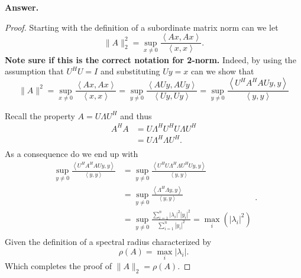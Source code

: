 \documentclass{article}
\theoremstyle{remark}
\newcommand{\newpara}
  {
  \vskip 0.4cm
  }
\begin{document}
  \textbf{Answer.} 
\begin{proof}
  Starting with the definition of a subordinate matrix norm \cite{sul} can we let \[
  \|A\|_{2}^{2} = \sup_{x \neq 0} \frac{\left<Ax, Ax \right>}{ \left<x,x \right>} .
  \] 
  \textbf{Note sure if this is the correct notation for 2-norm.} 
   Indeed, by using the assumption that $U^{H} U = I$ and substituting $Uy =  x$ can we show that \[
    \|A\|_{}^{2} = \sup_{x \neq 0} \frac{\left<Ax, Ax \right>}{\left<x,x \right>}  = \sup_{y\neq 0}  \frac{\left<AU y, A U y \right>}{ \left<U y, Uy \right>} = \sup_{y \neq 0} \frac{\left<U^{H} A^{H} A U y,y \right>}{\left<y,y \right>} 
  \] 
  \newpara
  Recall the property $A = U \Lambda  U^{H}$ and thus
  \[
    \begin{split}
  A^{H} A   & = U \Lambda ^{H} U^{H} U \Lambda U^{H}  \\
   & = U \Lambda ^{H} \Lambda U^{H}.   \\
    \end{split} 
  \] 
  As a consequence do we end up with \[
    \begin{split}
  \sup_{y \neq 0} \frac{\left<U^{H} A^{H} A U y, y  \right>}{\left<y,y \right>}   & = \sup_{y\neq 0}  \frac{\left<U^{H} U \Lambda ^{H} \Lambda  U^{H} U  y, y\right>}{ \left<y,y \right>}  \\
  &=  \sup_{y \neq 0} \frac{\left<\Lambda ^{H} \Lambda  y, y \right>}{\left<y,y \right>}  \\  
  &=   \sup_{ y \neq 0}  \frac{\sum_{i=1}^{n}  \left\lvert \lambda _{i} \right\rvert ^2  \left| y_{i} \right|^2}{ \sum_{i=1}^{n}  \left| y_{i} \right|^2}  = \max _{i} \left( \left\lvert \lambda_{i}  \right\rvert ^{2}  \right)  \\
    \end{split} .
  \] 
  Given the definition of a spectral radius \cite{quart} characterized by \[
  \rho \left( A \right) = \max_{i} \left\lvert \lambda_{i}  \right\rvert    .
  \] 
  Which completes the proof of $ \|A\|_{2} = \rho \left( A \right)$.
   
\end{proof}


\end{document}

